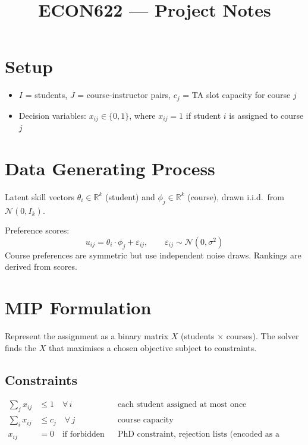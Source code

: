 \documentclass[11pt]{article}
\title{ECON622 --- Project Notes}
\author{}
\date{}
\begin{document}
\maketitle

\section{Setup}

\begin{itemize}
    \item $I$ = students, $J$ = course-instructor pairs, $c_j$ = TA slot capacity for course $j$
    \item Decision variables: $x_{ij} \in \{0,1\}$, where $x_{ij} = 1$ if student $i$ is assigned to course $j$
\end{itemize}

\section{Data Generating Process}

Latent skill vectors $\theta_i \in \mathbb{R}^k$ (student) and $\phi_j \in \mathbb{R}^k$ (course), drawn i.i.d.\ from $\mathcal{N}(0, I_k)$.

Preference scores:
\[
    u_{ij} = \theta_i \cdot \phi_j + \varepsilon_{ij}, \qquad \varepsilon_{ij} \sim \mathcal{N}(0, \sigma^2)
\]
Course preferences are symmetric but use independent noise draws. Rankings are derived from scores.

\section{MIP Formulation}

Represent the assignment as a binary matrix $X$ (students $\times$ courses).
The solver finds the $X$ that maximises a chosen objective subject to constraints.

\subsection*{Constraints}

\begin{align}
    \sum_j x_{ij} &\leq 1 \quad \forall\, i
        && \text{each student assigned at most once} \\[4pt]
    \sum_i x_{ij} &\leq c_j \quad \forall\, j
        && \text{course capacity} \\[4pt]
    x_{ij} &= 0 \quad \text{if forbidden}
        && \text{PhD constraint, rejection lists (encoded as a mask)}
\end{align}
\end{document}
